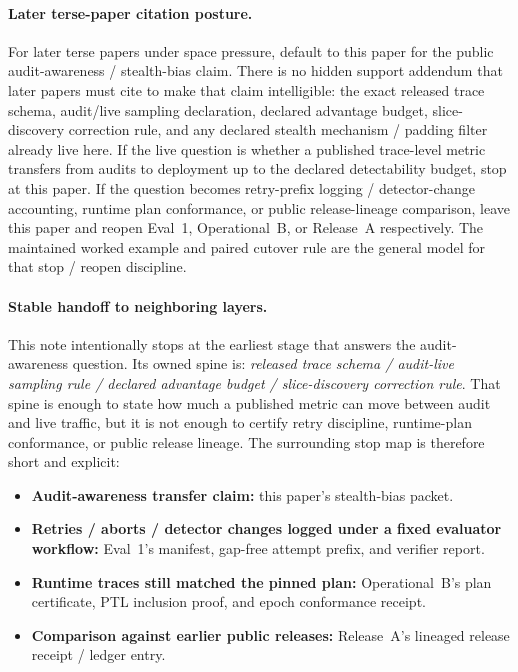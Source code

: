 \documentclass[11pt]{article}
\begin{document}
\paragraph{Later terse-paper citation posture.}
For later terse papers under space pressure, default to this paper for the public audit-awareness / stealth-bias claim.
There is no hidden support addendum that later papers must cite to make that claim intelligible: the exact released trace schema, audit/live sampling declaration, declared advantage budget, slice-discovery correction rule, and any declared stealth mechanism / padding filter already live here.
If the live question is whether a published trace-level metric transfers from audits to deployment up to the declared detectability budget, stop at this paper.
If the question becomes retry-prefix logging / detector-change accounting, runtime plan conformance, or public release-lineage comparison, leave this paper and reopen Eval~1, Operational~B, or Release~A respectively.
The maintained worked example and paired cutover rule are the general model for that stop / reopen discipline.\cite{series:workedexample,series:pairedterminalcutoverrules}

\paragraph{Stable handoff to neighboring layers.}
This note intentionally stops at the earliest stage that answers the audit-awareness question.
Its owned spine is:
\emph{released trace schema / audit-live sampling rule / declared advantage budget / slice-discovery correction rule}.
That spine is enough to state how much a published metric can move between audit and live traffic, but it is not enough to certify retry discipline, runtime-plan conformance, or public release lineage.
The surrounding stop map is therefore short and explicit:
\begin{itemize}[leftmargin=1.2em,itemsep=0.2em,topsep=0.35em]
\item \textbf{Audit-awareness transfer claim:} this paper's stealth-bias packet.
\item \textbf{Retries / aborts / detector changes logged under a fixed evaluator workflow:} Eval~1's manifest, gap-free attempt prefix, and verifier report.
\item \textbf{Runtime traces still matched the pinned plan:} Operational~B's plan certificate, PTL inclusion proof, and epoch conformance receipt.
\item \textbf{Comparison against earlier public releases:} Release~A's lineaged release receipt / ledger entry.
\end{itemize}
\end{document}
